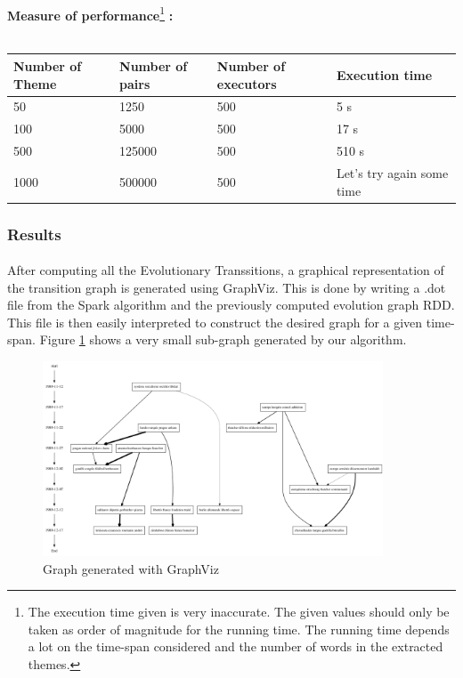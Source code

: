 \paragraph{}
\textbf{Measure of performance}\footnote{The execution time given is very inaccurate. The given values should only be taken as order of magnitude for the running time. The running time depends a lot on the time-span considered and the number of words in the extracted themes.}\textbf{ :}~\\
~\newline
\begin{tabular}{l|l|l|l}
\label{tab:quadratic}
Number of Theme & Number of pairs & Number of executors & Execution time \\ \hline
50 & 1250 & 500 & 5 s \\
100 & 5000 & 500 & 17 s \\
500 & 125000 & 500 & 510 s \\
1000 & 500000 & 500 & Let's try again some time \\
\end{tabular}

\subsubsection{Results}
\label{sec:EvoGraphResults}

\paragraph{}
After computing all the Evolutionary Transsitions, a graphical representation of the transition graph is generated using GraphViz. This is done by writing a .dot file from the Spark algorithm and the previously computed evolution graph RDD. This file is then easily interpreted to construct the desired graph for a given time-span. Figure \ref{fig:graph} shows a very small sub-graph generated by our algorithm. 

\begin{figure}[H]
\begin{center}
\includegraphics[width=0.9\textwidth]{images/graph.png}
\caption{Graph generated with GraphViz}
\label{fig:graph}
\end{center}
\end{figure}
